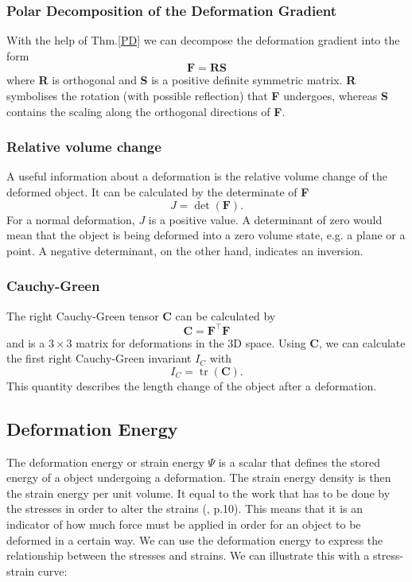 \subsubsection{Polar Decomposition of the Deformation Gradient}
With the help of Thm.\ref{PD} we can decompose the deformation gradient into the form
\begin{equation}\label{PD_DG}
	\mathbf{F} = \mathbf{RS}
\end{equation}
where \textbf{R} is orthogonal and \textbf{S} is a positive definite symmetric matrix. \textbf{R} symbolises the rotation (with possible reflection) that \textbf{F} undergoes, whereas \textbf{S} contains the scaling along the orthogonal directions of \textbf{F}.

\subsubsection{Relative volume change}
A useful information about a deformation is the relative volume change of the deformed object. It can be calculated by the determinate of \textbf{F}
\begin{equation}\label{det_DG}
	J = \operatorname{det}(\mathbf{F}).
\end{equation}
For a normal deformation, $J$ is a positive value. A determinant of zero would mean that the object is being deformed into a zero volume state, e.g. a plane or a point. A negative determinant, on the other hand, indicates an inversion.


\subsubsection{Cauchy-Green}
The right Cauchy-Green tensor \textbf{C} can be calculated by 
\begin{equation}\label{CG_DG}
	\mathbf{C} = \mathbf{F^\intercal F}
\end{equation}
and is a $3 \times 3$ matrix for deformations in the 3D space. Using \textbf{C}, we can calculate the first right Cauchy-Green invariant $I_C$ with
\begin{equation} \label{tr_CG_DG}
	I_C = \operatorname{tr}(\mathbf{C}).
\end{equation}
This quantity describes the length change of the object after a deformation.

\subsection{Deformation Energy}
The deformation energy or strain energy $\Psi$ is a scalar that defines the stored energy of a object undergoing a deformation. The strain energy density is then the strain energy per unit volume. It equal to the work that has to be done by the stresses in order to alter the strains (\cite{KORSUNSKY20175}, p.10). This means that it is an indicator of how much force must be applied in order for an object to be deformed in a certain way. We can use the deformation energy to express the relationship between the stresses and strains. We can illustrate this with a stress-strain curve:

